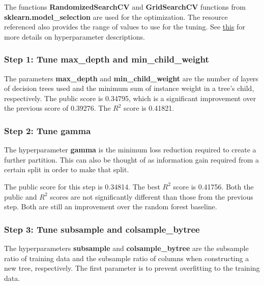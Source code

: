 \documentclass[12pt]{article}
\theoremstyle{plain} %
\theoremstyle{definition} %
\theoremstyle{remark} %
\begin{document}
The functions \textbf{RandomizedSearchCV} and \textbf{GridSearchCV} functions from \\\textbf{sklearn.model\_selection} are used for the optimization.  The resource referenced also provides the range of values to use for the tuning.  See \href{http://xgboost.readthedocs.io/en/latest/parameter.html}{this} for more details on hyperparameter descriptions.

\subsubsection*{Step 1:  Tune \textbf{max\_depth} and \textbf{min\_child\_weight}}

\indent \par The parameters \textbf{max\_depth} and \textbf{min\_child\_weight} are the number of layers of decision trees used and the minimum sum of instance weight in a tree's child, respectively.  The public score is 0.34795, which is a significant improvement over the previous score of 0.39276. The $R^2$ score is 0.41821.

\subsubsection*{Step 2:  Tune \textbf{gamma}}

\indent \par The hyperparameter \textbf{gamma} is the minimum loss reduction required to create a further partition.  This can also be thought of as information gain required from a certain split in order to make that split.

\par The public score for this step is 0.34814.  The best $R^2$ score is 0.41756.  Both the public and $R^2$ scores are not significantly different than those from the previous step.  Both are still an improvement over the random forest baseline.

\subsubsection*{Step 3:  Tune \textbf{subsample} and \textbf{colsample\_bytree}}

\indent \par The hyperparameters \textbf{subsample} and \textbf{colsample\_bytree} are the subsample ratio of training data and the subsample ratio of columns when constructing a new tree, respectively.  The first parameter is to prevent overfitting to the training data.
\end{document}
